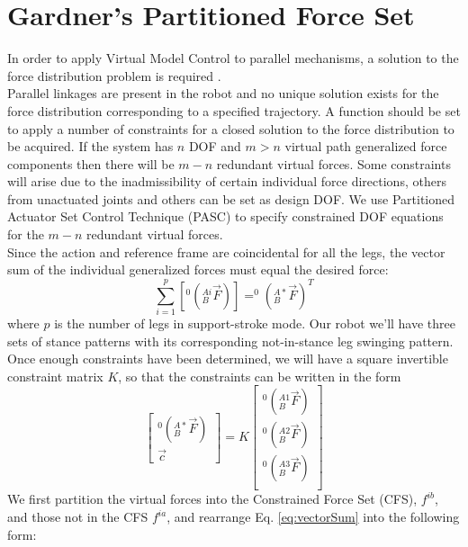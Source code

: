 \documentclass[]{article}
\begin{document}
\section{Gardner's Partitioned Force Set}
In order to apply Virtual Model Control to parallel mechanisms, a solution to the force distribution problem is required \cite{torres_virtual_1996}.\\Parallel linkages are present in the robot and no unique solution exists for the force distribution corresponding to a specified trajectory. A function should be set to apply a number of constraints for a closed solution to the force distribution to be acquired. If the system has $n$ DOF and $m>n$ virtual path generalized force components then there will be $m-n$ redundant virtual forces. Some constraints will arise due to the inadmissibility of certain individual force directions, others from unactuated joints and others can be set as design DOF. We use Partitioned Actuator Set Control Technique (PASC)\cite{gardner_solution_1990} to specify constrained DOF equations for the $m-n$ redundant virtual forces.\\
Since the action and reference frame are coincidental for all the legs, the vector sum of the individual generalized forces must equal the desired force:
\begin{equation}
\sum_{i=1}^{p} [^0(_B^{Ai}\vec{F})]=^0(_B^{A*}\vec{F})^T
\label{eq:vectorSum}
\end{equation}
where $p$ is the number of legs in support-stroke mode. Our robot we'll have three sets of stance patterns with its corresponding not-in-stance leg swinging pattern. \\
Once enough constraints have been determined, we will have a square invertible constraint matrix
$K$, so that the constraints can be written in the form
\begin{equation}
\begin{bmatrix}
^0(_B^{A*}\vec{F})	\\
\vec{c}
\end{bmatrix}
=K
\begin{bmatrix}
^0(_B^{A1}\vec{F})	\\ 
^0(_B^{A2}\vec{F})	\\ 
^0(_B^{A3}\vec{F}) 	\\ 
\end{bmatrix} \label{eq:gaitMatrix}
\end{equation}
We first partition the virtual forces into the Constrained Force Set (CFS), $f^{ib}$, and those not in
the CFS $f^{ia}$, and rearrange Eq. \ref{eq:vectorSum} into the following form:
\end{document}
